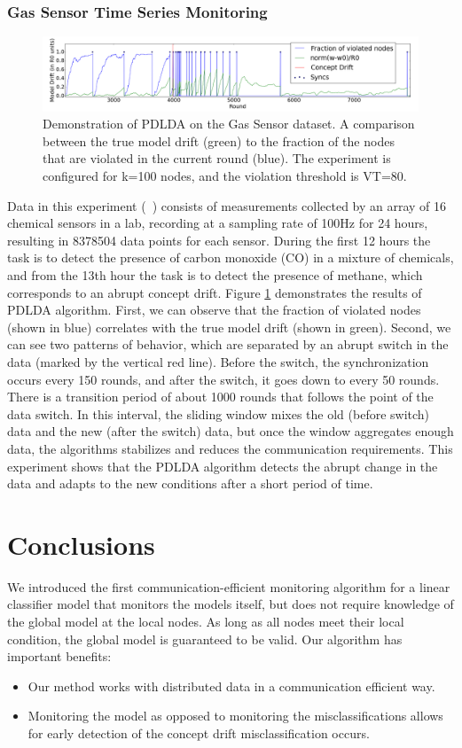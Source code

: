 \documentclass{vldb}
\begin{document}
\subsubsection{Gas Sensor Time Series Monitoring}
\begin{figure}[h]
\centering
\includegraphics[width=\textwidth]{BigGas/overTime100k.png}
\caption{Demonstration of PDLDA on the Gas Sensor dataset.
A comparison between the true model drift (green) to the fraction of the nodes that
are violated in the current round (blue).
The experiment is configured for k=100 nodes, and the violation threshold is
VT=80.}
\label{BigGasOverTime}
\end{figure}
Data in this experiment (~\citealt{bigGas}) consists of measurements collected
by an array of 16 chemical sensors in a lab, recording at a sampling
rate of 100Hz for 24 hours, resulting in 8378504 data points for each sensor.
During the first 12 hours the task is to detect the presence of carbon monoxide
(CO) in a mixture of chemicals, and from the 13th hour the task is to detect the presence of methane, which corresponds to an abrupt concept drift.
Figure \ref{BigGasOverTime} demonstrates the results of PDLDA algorithm.
First, we can observe that the fraction of violated nodes (shown in blue) correlates with the true model drift (shown in green). Second, we can see two patterns of behavior, which are separated by an abrupt switch in the data  (marked by the vertical red line). Before the switch,  the synchronization occurs every 150 rounds, and after the switch, it goes down to every 50 rounds. There is a transition period of about 1000 rounds that follows the point of the data switch. In this interval, the sliding window mixes the old (before switch) data and the new (after the switch) data, but once the window aggregates enough data, the algorithms stabilizes and reduces the communication requirements.   This experiment shows that the PDLDA algorithm detects the abrupt change in the data and adapts to the new conditions after a short period of time.
\section*{Conclusions}
We introduced the first communication-efficient monitoring algorithm for a linear classifier model that monitors the
models itself, but does not require knowledge of the global model at the local nodes.
As long as all nodes meet their local condition, the
global model is guaranteed to be valid. Our algorithm has important benefits:
\begin{itemize}
  \item Our method works with distributed data in a communication efficient way.
  \item Monitoring the model as opposed to monitoring the misclassifications allows for early detection of the concept drift misclassification occurs.
\end{itemize}
\end{document}
